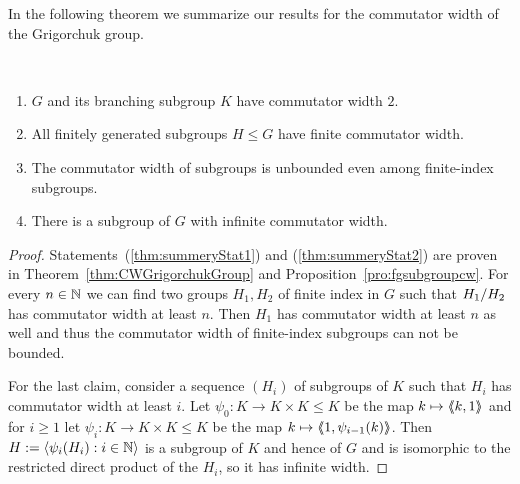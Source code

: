 \documentclass[a4paper,11pt]{amsart}
\begin{document}
In the following theorem we summarize our results for the commutator width of the Grigorchuk group.
\begin{thm}\ 
 \begin{enumerate}
  \item $G$ and its branching subgroup $K$ have commutator width $2$. \label{thm:summeryStat1}
  \item All finitely generated subgroups $H\leq G$ have finite commutator width.\label{thm:summeryStat2}
  \item \label{thm:summeryStat3} The commutator width of subgroups is unbounded even among finite-index subgroups.
\item \label{thm:summeryStat4} There is a subgroup of $G$ with infinite commutator width.
 \end{enumerate}
\end{thm}
\begin{proof}
 Statements~(\ref{thm:summeryStat1}) and (\ref{thm:summeryStat2}) are proven in Theorem~\ref{thm:CWGrigorchukGroup} and Proposition~\ref{pro:fgsubgroupcw}.
 For every $n\in\mathbb{N}$ we can find two groups $H_1,H_2$ of finite index in $G$ such that ${H_1/H_2}$ has commutator
 width at least $n$. Then $H_1$ has commutator width at least $n$ as well and thus the commutator width of finite-index subgroups can not be bounded.

 For the last claim, consider a sequence $(H_i)$ of subgroups of $K$
 such that $H_i$ has commutator width at least $i$. Let
 $\psi_0\colon K\to K\times K\le K$ be the map $k\mapsto\langle\negthickspace\langle k,1\rangle\negthickspace\rangle$
 and for $i\ge1$ let $\psi_i\colon K\to K\times K\le K$ be the map
 $k\mapsto\langle\negthickspace\langle1,\psi_{i-1}(k)\rangle\negthickspace\rangle$. Then
 $H:=\langle\psi_i(H_i):i\in\mathbb{N}\rangle$ is a subgroup of $K$ and hence
 of $G$ and is isomorphic to the restricted direct product of the
 $H_i$, so it has infinite width.  
\end{proof}
\end{document}
